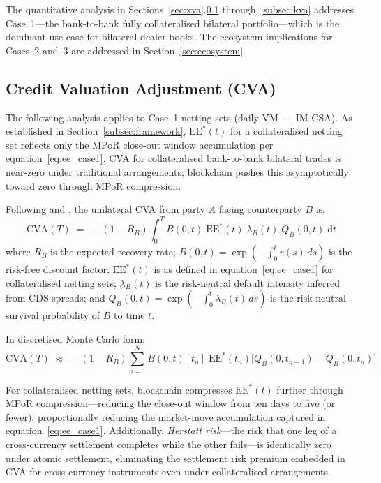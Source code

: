 \documentclass[12pt,letterpaper]{article}
\numberwithin{equation}{section}
\theoremstyle{remark}
\newcommand{\EE}{\mathrm{EE}}
\newcommand{\df}{B(0,t)}
\newcommand{\surv}[1]{Q_{#1}(0,t)}
\newcommand{\hz}[1]{\lambda_{#1}(t)}
\begin{document}
The quantitative analysis in Sections~\ref{sec:xva}.\ref{subsec:cva}
through~\ref{subsec:kva} addresses Case~1---the bank-to-bank fully
collateralised bilateral portfolio---which is the dominant use case for
bilateral dealer books. The ecosystem implications for Cases~2 and~3 are
addressed in Section~\ref{sec:ecosystem}.

\subsection{Credit Valuation Adjustment (CVA)}
\label{subsec:cva}

The following analysis applies to Case~1 netting sets (daily VM~+~IM CSA).
As established in Section~\ref{subsec:framework}, $\EE^*(t)$ for a
collateralised netting set reflects only the MPoR close-out window
accumulation per equation~\eqref{eq:ee_case1}. CVA for collateralised
bank-to-bank bilateral trades is near-zero under traditional arrangements;
blockchain pushes this asymptotically toward zero through MPoR compression.

Following \citet{pykhtin_zhu_2007} and \citet{gregory_2020}, the unilateral
CVA from party $A$ facing counterparty $B$ is:
\begin{equation}
  \mathrm{CVA}(T) \;=\; -(1-R_B)
  \int_0^T \!\df\;\EE^{*}(t)\;\hz{B}\;\surv{B}\;\mathrm{d}t
  \label{eq:cva}
\end{equation}
where $R_B$ is the expected recovery rate; $B(0,t)=\exp(-\int_0^t r(s)\,ds)$
is the risk-free discount factor; $\EE^{*}(t)$ is as defined in
equation~\eqref{eq:ee_case1} for collateralised netting sets; $\hz{B}$
is the risk-neutral default intensity inferred from CDS spreads; and
$\surv{B}=\exp(-\int_0^t\hz{B}\,ds)$ is the risk-neutral survival
probability of $B$ to time $t$.

In discretised Monte Carlo form:
\begin{equation}
  \mathrm{CVA}(T) \;\approx\; -(1-R_B)\sum_{n=1}^{N}
  \df[t_n]\;\EE^{*}(t_n)
  \bigl[Q_B(0,t_{n-1}) - Q_B(0,t_n)\bigr]
  \label{eq:cvadiscrete}
\end{equation}

For collateralised netting sets, blockchain compresses $\EE^{*}(t)$ further
through MPoR compression---reducing the close-out window from ten days to
five (or fewer), proportionally reducing the market-move accumulation
captured in equation~\eqref{eq:ee_case1}. Additionally,
\emph{Herstatt risk}---the risk that one leg of a cross-currency settlement
completes while the other fails---is identically zero under atomic
settlement, eliminating the settlement risk premium embedded in CVA for
cross-currency instruments even under collateralised arrangements.
\end{document}
